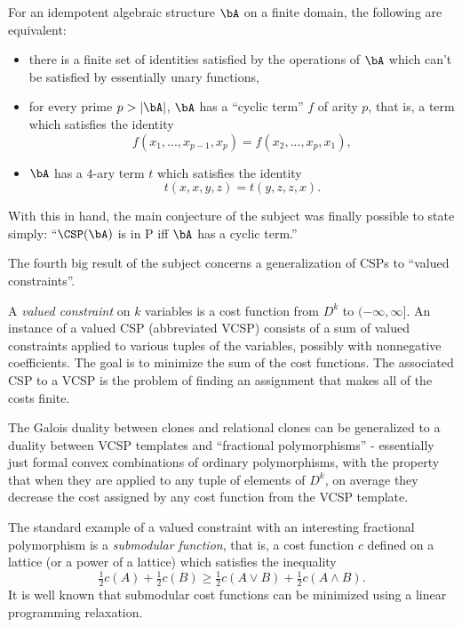 \begin{thm} For an idempotent algebraic structure $\bA$ on a finite domain, the following are equivalent:
\begin{itemize}
\item there is a finite set of identities satisfied by the operations of $\bA$ which can't be satisfied by essentially unary functions,

\item for every prime $p > |\bA|$, $\bA$ has a ``cyclic term'' $f$ of arity $p$, that is, a term which satisfies the identity
\[
f(x_1, ..., x_{p-1}, x_p) = f(x_2, ..., x_p, x_1),
\]

\item $\bA$ has a $4$-ary term $t$ which satisfies the identity
\[
t(x,x,y,z) = t(y,z,z,x).
\]
\end{itemize}
\end{thm}

With this in hand, the main conjecture of the subject was finally possible to state simply: ``$\CSP(\bA)$ is in P iff $\bA$ has a cyclic term.''

The fourth big result of the subject concerns a generalization of CSPs to ``valued constraints''.

\begin{defn} A \emph{valued constraint} on $k$ variables is a cost function from $D^k$ to $(-\infty, \infty]$. An instance of a valued CSP (abbreviated VCSP) consists of a sum of valued constraints applied to various tuples of the variables, possibly with nonnegative coefficients. The goal is to minimize the sum of the cost functions. The associated CSP to a VCSP is the problem of finding an assignment that makes all of the costs finite.
\end{defn}

The Galois duality between clones and relational clones can be generalized to a duality between VCSP templates and ``fractional polymorphisms'' - essentially just formal convex combinations of ordinary polymorphisms, with the property that when they are applied to any tuple of elements of $D^k$, on average they decrease the cost assigned by any cost function from the VCSP template.

The standard example of a valued constraint with an interesting fractional polymorphism is a \emph{submodular function}, that is, a cost function $c$ defined on a lattice (or a power of a lattice) which satisfies the inequality
\[
\tfrac{1}{2}c(A) + \tfrac{1}{2}c(B) \ge \tfrac{1}{2}c(A\vee B) + \tfrac{1}{2}c(A\wedge B).
\]
It is well known that submodular cost functions can be minimized using a linear programming relaxation.

